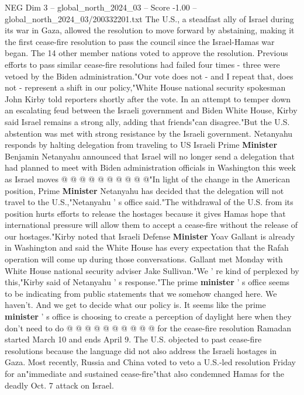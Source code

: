 \begin{textsample}{NEG Dim 3 – global\_north\_2024\_03 – Score -1.00 – global\_north\_2024\_03/200332201.txt}  \label{ex:f3_neg_184}
The U.S., a steadfast ally of Israel during its war in Gaza, allowed the resolution to move forward by abstaining, making it the first cease-fire resolution to pass the council since the Israel-Hamas war began.
The 14 other member nations voted to approve the resolution.
Previous efforts to pass similar cease-fire resolutions had failed four times - three were vetoed by the Biden administration."Our vote does not - and I repeat that, does not - represent a shift in our policy,"White House national security spokesman John Kirby told reporters shortly after the vote.
In an attempt to temper down an escalating feud between the Israeli government and Biden White House, Kirby said Israel remains a strong ally, adding that friends"can disagree."But the U.S. abstention was met with strong resistance by the Israeli government.
Netanyahu responds by halting delegation from traveling to US Israeli Prime \textbf{Minister} Benjamin Netanyahu announced that Israel will no longer send a delegation that had planned to meet with Biden administration officials in Washington this week as Israel moves @ @ @ @ @ @ @ @ @ @"In light of the change in the American position, Prime \textbf{Minister} Netanyahu has decided that the delegation will not travel to the U.S.,"Netanyahu ' s office said."The withdrawal of the U.S. from its position hurts efforts to release the hostages because it gives Hamas hope that international pressure will allow them to accept a cease-fire without the release of our hostages."Kirby noted that Israeli Defense \textbf{Minister} Yoav Gallant is already in Washington and said the White House has every expectation that the Rafah operation will come up during those conversations.
Gallant met Monday with White House national security adviser Jake Sullivan."We ' re kind of perplexed by this,"Kirby said of Netanyahu ' s response."The prime \textbf{minister} ' s office seems to be indicating from public statements that we somehow changed here.
We haven't.
And we get to decide what our policy is.
It seems like the prime \textbf{minister} ' s office is choosing to create a perception of daylight here when they don't need to do @ @ @ @ @ @ @ @ @ @ for the cease-fire resolution Ramadan started March 10 and ends April 9.
The U.S. objected to past cease-fire resolutions because the language did not also address the Israeli hostages in Gaza.
Most recently, Russia and China voted to veto a U.S.-led resolution Friday for an"immediate and sustained cease-fire"that also condemned Hamas for the deadly Oct. 7 attack on Israel.

\end{textsample}
